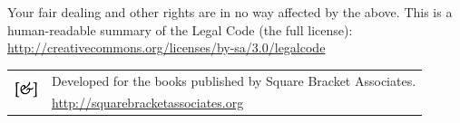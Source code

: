 \documentclass[english,twoside,openany,showtrims]{sbabook}
\begin{document}
{  Your fair dealing and other rights are in no way affected by the
  above. This is a human-readable summary of the Legal Code (the full
  license): \\
  \url{http://creativecommons.org/licenses/by-sa/3.0/legalcode}

  \vfill

  \begin{tabular}{@{}c@{\quad}l}
    \multirow{2}{*}{\includegraphics[width=2em]{sba-logo.pdf}}
    & Developed for the books published by Square Bracket Associates. \\
    & \url{http://squarebracketassociates.org} \\[\smallskipamount]
  \end{tabular}
}


\frontmatter
\pagestyle{plain}

\tableofcontents*

\clearpage
\listoffigures

\mainmatter












%
%
%
%
%
%
%
%



\clearpage
\end{document}
